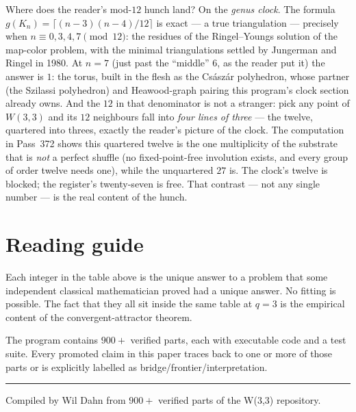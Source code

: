 \documentclass[11pt]{article}
\def\textit#1{#1}%
\begin{document}
Where does the reader's mod-$12$ hunch land? On the \emph{genus clock}. The
formula $g(K_n)=\lceil(n-3)(n-4)/12\rceil$ is exact --- a true triangulation
--- precisely when $n\equiv0,3,4,7\pmod{12}$: the residues of the
Ringel--Youngs solution of the map-color problem, with the minimal
triangulations settled by Jungerman and Ringel in 1980. At $n=7$ (just past
the ``middle'' $6$, as the reader put it) the answer is $1$: the torus, built
in the flesh as the Cs\'asz\'ar polyhedron, whose partner (the Szilassi
polyhedron) and Heawood-graph pairing this program's clock section already
owns. And the $12$ in that denominator is not a stranger: pick any point of
$W(3,3)$ and its $12$ neighbours fall into \emph{four lines of three} --- the
twelve, quartered into threes, exactly the reader's picture of the clock. The
computation in Pass~372 shows this quartered twelve is the one multiplicity of
the substrate that is \emph{not} a perfect shuffle (no fixed-point-free
involution exists, and every group of order twelve needs one), while the
unquartered $27$ is. The clock's twelve is blocked; the register's
twenty-seven is free. That contrast --- not any single number --- is the real
content of the hunch.

\section{Reading guide}

Each integer in the table above is the unique answer to a problem that some independent classical mathematician proved had a unique answer. No fitting is possible. The fact that they all sit inside the same table at $q = 3$ is the empirical content of the convergent-attractor theorem.

The program contains $900+$ verified parts, each with executable code and a test suite. Every promoted claim in this paper traces back to one or more of those parts or is explicitly labelled as bridge/frontier/interpretation.

\vspace{2em}
\noindent\rule{0.98\linewidth}{0.4pt}
\vspace{1em}

\begin{center}
\textit{Compiled by Wil Dahn from $900+$ verified parts of the W(3,3) repository.}
\end{center}
\end{document}

